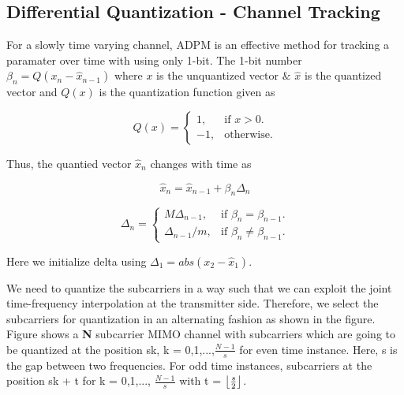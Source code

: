 \documentclass[conference]{IEEEtran}
\DeclarePairedDelimiter\floor{\lfloor}{\rfloor}
\begin{document}


  

\subsection{Differential Quantization - Channel Tracking} 
\label{quantiz} 

For a slowly time varying channel, ADPM is an effective method for tracking a paramater over time with using only 1-bit. The 1-bit number $\beta_{n} = Q(x_{n} - \hat{x}_{n-1})$ where $x$ is the unquantized vector $\&$ $\hat{x}$ is the quantized vector and $Q(x)$ is the quantization function given as 

  

\begin{equation}
  Q(x)=\begin{cases}
    1, & \text{if $x>0$}.\\
    -1, & \text{otherwise}.
  \end{cases}
\end{equation}

Thus, the quantied vector $\hat{x}_n$ changes with time as 

\begin{equation} 
\hat{x}_{n} = \hat{x}_{n-1} + \beta_{n}\Delta_{n} 
\end{equation} 

\begin{equation} 
\Delta_{n} = \begin{cases} 
    M \Delta_{n-1}, & \text{if $\beta_{n} = \beta_{n-1}$}.\\ 
    \Delta_{n-1}/m , & \text{if $\beta_{n} \neq \beta_{n-1}$}. 
  \end{cases} 
\end{equation} 

Here we initialize delta using $\Delta_1 = abs(x_{2}-\hat{x}_1)$.

We need to quantize the subcarriers in a way such that we can exploit the joint time-frequency interpolation at the transmitter side. Therefore, we select the subcarriers for quantization in an alternating fashion as shown in the figure. Figure shows a \textbf{N} subcarrier MIMO channel with subcarriers which are going to be quantized at the position sk, k = 0,1,...,$\frac{N-1}{s}$ for even time instance. Here, s is the gap between two frequencies. For odd time instances, subcarriers at the position sk + t for k = 0,1,..., $\frac{N-1}{s}$ with t = $\floor*{\frac{s}{2}}$. 
\end{document}

